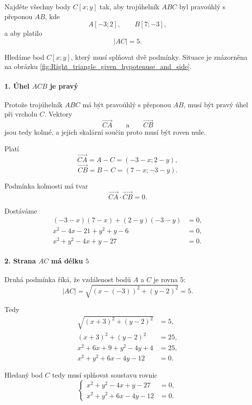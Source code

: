 \begin{example}\label{exa:Right_triangle_given_hypotenuse_and_side}
    Najděte všechny body $C[x;y]$ tak, aby trojúhelník $ABC$ byl
    pravoúhlý s přeponou $AB$, kde
    \[
        A[-3;2],
        \qquad
        B[7;-3],
    \]
    a aby platilo
    \[
        |AC|=5.
    \]

    Hledáme bod $C[x;y]$, který musí splňovat dvě podmínky. Situace je
    znázorněna na obrázku \ref{fig:Right_triangle_given_hypotenuse_and_side}.

    \paragraph{1. Úhel $ACB$ je pravý}

    Protože trojúhelník $ABC$ má být pravoúhlý s přeponou $AB$, musí být
    pravý úhel při vrcholu $C$. Vektory
    \[
        \overrightarrow{CA}
        \qquad\text{a}\qquad
        \overrightarrow{CB}
    \]
    jsou tedy kolmé, a jejich skalární součin proto musí být roven nule.

    Platí
    \[
        \overrightarrow{CA}=A-C=(-3-x;2-y),
    \]
    \[
        \overrightarrow{CB}=B-C=(7-x;-3-y).
    \]

    Podmínka kolmosti má tvar
    \[
        \overrightarrow{CA}\cdot\overrightarrow{CB}=0.
    \]

    Dostáváme
    \begin{align*}
        (-3-x)(7-x)+(2-y)(-3-y)&=0,\\
        x^2-4x-21+y^2+y-6&=0,\\
        x^2+y^2-4x+y-27&=0.
    \end{align*}

    \paragraph{2. Strana $AC$ má délku $5$}

    Druhá podmínka říká, že vzdálenost bodů $A$ a $C$ je rovna $5$:
    \[
        |AC|=\sqrt{(x-(-3))^2+(y-2)^2}=5.
    \]

    Tedy
    \begin{align*}
        \sqrt{(x+3)^2+(y-2)^2}&=5,\\
        (x+3)^2+(y-2)^2&=25,\\
        x^2+6x+9+y^2-4y+4&=25,\\
        x^2+y^2+6x-4y-12&=0.
    \end{align*}

    Hledaný bod $C$ tedy musí splňovat soustavu rovnic
    \[
        \left\{
        \begin{aligned}
            x^2+y^2-4x+y-27&=0,\\
            x^2+y^2+6x-4y-12&=0.
        \end{aligned}
        \right.
    \]


\end{example}
